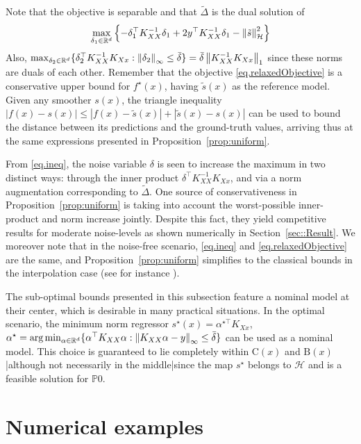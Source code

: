 Note that the objective is separable and that $\tilde\Delta$ is the dual solution of 
\begin{equation}
	\max_{\delta_1 \in \mathbb{R}^d} \left\{ -\delta_1^\top K_{XX}^{-1}\delta_1 + 2y^\top K_{XX}^{-1}\delta_1 - \left\| \tilde s \right\|_\mathcal{H}^2 \right\}
\end{equation}
Also, $\max_{\delta_2 \in \mathbb{R}^d} \{ \delta_2^\top K_{XX}^{-1}K_{Xx} : \left\| \delta_2 \right\|_\infty \leq \bar\delta \} = \bar{\delta} \left\| K_{XX}^{-1}K_{Xx} \right\|_1$ since these norms are duals of each other. Remember that the objective \eqref{eq.relaxedObjective} is a conservative upper bound for $f^\star(x)$, having $\tilde s(x)$ as the reference model. Given any smoother $s(x)$, the triangle inequality $|f(x) - s(x)| \leq |f(x) - \tilde s(x)| + |\tilde s(x) - s(x)|$ can be used to bound the distance between its predictions and the ground-truth values, arriving thus at the same expressions presented in Proposition~\ref{prop:uniform}.

From \eqref{eq.ineq}, the noise variable $\delta$ is seen to increase the maximum in two distinct ways: through the inner product $\delta^\top K_{XX}^{-1}K_{Xx}$, and via a norm augmentation corresponding to $\tilde\Delta$. One source of conservativeness in Proposition~\ref{prop:uniform} is taking into account the worst-possible inner-product and norm increase jointly. Despite this fact, they yield competitive results for moderate noise-levels as shown numerically in Section~\ref{sec::Result}. We moreover note that in the noise-free scenario, \eqref{eq.ineq} and \eqref{eq.relaxedObjective} are the same, and Proposition~\ref{prop:uniform} simplifies to the classical bounds in the interpolation case (see for instance \cite{fasshauer2011positive}).

\begin{remark}
	The sub-optimal bounds presented in this subsection feature a nominal model at their center, which is desirable in many practical situations. In the optimal scenario, the minimum norm regressor $s^\star(x) = \alpha^{\star\top} K_{Xx}$, $\alpha^\star = \text{arg}\min_{\alpha \in \mathbb{R}^d} \{ \alpha^\top K_{XX} \alpha : \left\| K_{XX} \alpha - y \right\|_\infty \leq \bar\delta \}$ can be used as a nominal model. This choice is guaranteed to lie completely within $\text{C}(x)$ and $\text{B}(x)$|although not necessarily in the middle|since the map $s^\star$ belongs to $\mathcal{H}$ and is a feasible solution for $\mathds{P}0$.
\end{remark}

\section{Numerical examples}



